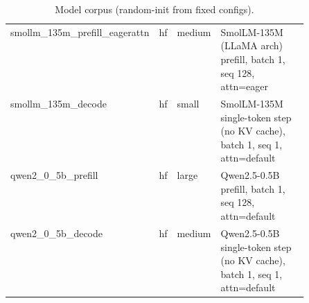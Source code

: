 \begin{table}[h]
\begin{tabular}{lllp{0.5\linewidth}}
smollm\_135m\_prefill\_eagerattn & hf & medium & SmolLM-135M (LLaMA arch) prefill, batch 1, seq 128, attn=eager \\
smollm\_135m\_decode & hf & small & SmolLM-135M single-token step (no KV cache), batch 1, seq 1, attn=default \\
qwen2\_0\_5b\_prefill & hf & large & Qwen2.5-0.5B prefill, batch 1, seq 128, attn=default \\
qwen2\_0\_5b\_decode & hf & medium & Qwen2.5-0.5B single-token step (no KV cache), batch 1, seq 1, attn=default \\
\bottomrule\end{tabular}
\caption{Model corpus (random-init from fixed configs).}\label{tab:corpus}
\end{table}%
